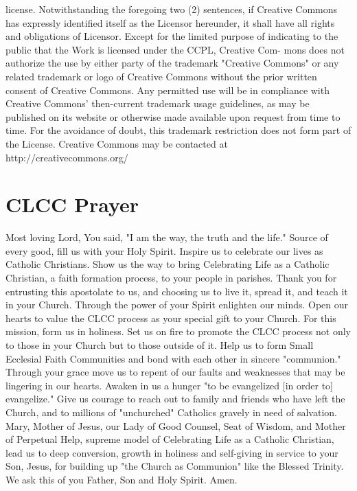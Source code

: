 \documentclass[oneside]{book}
\begin{document}
license. Notwithstanding the foregoing two (2) sentences, if Creative Commons
has expressly identified itself as the Licensor hereunder, it shall have all
rights and obligations of Licensor.  Except for the limited purpose of
indicating to the public that the Work is licensed under the CCPL, Creative Com-
mons does not authorize the use by either party of the trademark "Creative
Commons" or any related trademark or logo of Creative Commons without the prior
written consent of Creative Commons. Any permitted use will be in compliance
with Creative Commons' then-current trademark usage guidelines, as may be
published on its website or otherwise made available upon request from time to
time. For the avoidance of doubt, this trademark restriction does not form part
of the License.  Creative Commons may be contacted at
http://creativecommons.org/


\part{CLCC Prayer}

Most loving Lord, You said, "I am the way, the truth and the life." Source of
every good, fill us with your Holy Spirit. Inspire us to celebrate our lives as
Catholic Christians. Show us the way to bring Celebrating Life as a Catholic
Christian, a faith formation process, to your people in parishes. Thank you for
entrusting this apostolate to us, and choosing us to live it, spread it, and
teach it in your Church.  Through the power of your Spirit enlighten our
minds. Open our hearts to value the CLCC process as your special gift to your
Church. For this mission, form us in holiness. Set us on fire to promote the
CLCC process not only to those in your Church but to those outside of it.  Help
us to form Small Ecclesial Faith Communities and bond with each other in sincere
"communion." Through your grace move us to repent of our faults and weaknesses
that may be lingering in our hearts.  Awaken in us a hunger "to be evangelized
[in order to] evangelize." Give us courage to reach out to family and friends
who have left the Church, and to millions of "unchurched" Catholics gravely in
need of salvation.  Mary, Mother of Jesus, our Lady of Good Counsel, Seat of
Wisdom, and Mother of Perpetual Help, supreme model of Celebrating Life as a
Catholic Christian, lead us to deep conversion, growth in holiness and
self-giving in service to your Son, Jesus, for building up "the Church as
Communion" like the Blessed Trinity. We ask this of you Father, Son and Holy
Spirit. Amen.

\end{document}

